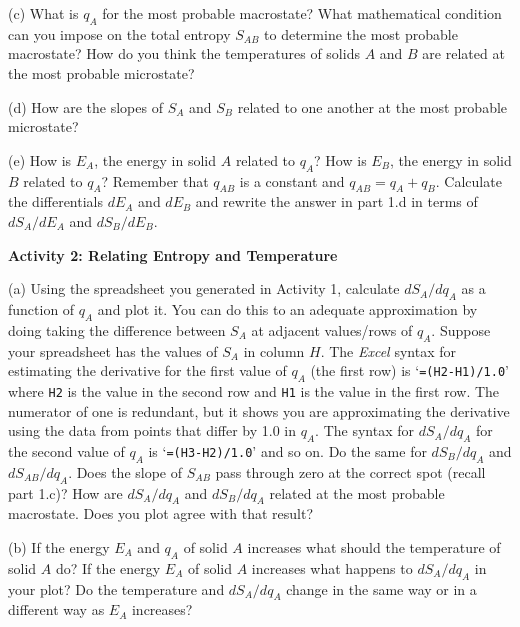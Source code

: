 (c) What is $q_A$ for the most probable macrostate? What mathematical condition can you impose
on the total entropy $S_{AB}$ to determine the most probable macrostate?
How do you think the temperatures of solids $A$ and $B$ are related at the most probable 
microstate?
\vspace{15mm}

(d) How are the slopes of $S_A$ and $S_B$ related to one another at the most probable
microstate?
\vspace{30mm}

\newpage

(e) How is $E_A$, the energy in solid $A$ related to $q_A$?
How is $E_B$, the energy in solid $B$ related to $q_A$?
Remember that $q_{AB}$ is a constant and $q_{AB} = q_A + q_B$.
Calculate the differentials $dE_A$ and $dE_B$ and rewrite the answer in part 1.d
in terms of $dS_A/dE_A$ and $dS_B/dE_B$.
\vspace{45mm}

\textbf{Activity 2: Relating Entropy and Temperature}

(a) Using the spreadsheet you generated in Activity 1, calculate $dS_A/dq_A$ as a function
of $q_A$ and plot it. You can do this to an adequate approximation
by doing taking the difference between $S_A$ at adjacent values/rows
of $q_A$.
Suppose your spreadsheet has the values of $S_A$ in column $H$.
The {\it Excel} syntax for estimating the derivative for the first value of
$q_A$ (the first row) is 
`{\tt =(H2-H1)/1.0}' where {\tt H2} is the value in the second row and {\tt H1} is the
value in the first row.
The numerator of one is redundant, but it shows you are approximating the derivative
using the data from points that differ by 1.0 in $q_A$.
The syntax for $dS_A/dq_A$ for the second value of $q_A$ is `{\tt =(H3-H2)/1.0}' and so on.
Do the same for $dS_B/dq_A$ and $dS_{AB}/dq_A$.
Does the slope of $S_{AB}$ pass through zero at the correct spot (recall part 1.c)?
How are $dS_A/dq_A$ and $dS_B/dq_A$ related at the most probable macrostate.
Does you plot agree with that result?
\vspace{15mm}

(b) If the energy $E_A$ and $q_A$ of solid $A$ increases what should the temperature 
of solid $A$ do?
If the energy $E_A$ of solid $A$ increases what happens to $dS_A/dq_A$ in your plot?
Do the temperature and $dS_A/dq_A$ change in the same  way or in a different way 
as $E_A$ increases?
\vspace{15mm}

